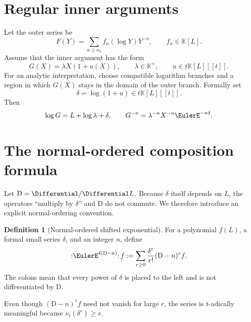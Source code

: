 \documentclass[11pt,openany]{book}
\theoremstyle{definition}
\newtheorem{definition}{Definition}[chapter]
\theoremstyle{plain}
\theoremstyle{remark}
\newcommand{\K}{\mathbb{K}}
\newcommand{\val}{\nu}
\newcommand{\Dop}{\mathrm{D}}
\begin{document}
\section{Regular inner arguments}
Let the outer series be
\begin{equation}\label{eq:outer-composition}
 F(Y)=\sum_{n\ge n_0}f_n(\log Y)Y^{-n},
 \qquad f_n\in\K[L].
\end{equation}
Assume that the inner argument has the form
\begin{equation}\label{eq:regular-inner}
 G(X)=\lambda X(1+u(X)),
 \qquad \lambda\in\K^\times,
 \qquad u\in t\K[L][[t]].
\end{equation}
For an analytic interpretation, choose compatible logarithm branches and a
region in which \(G(X)\) stays in the domain of the outer branch.  Formally set
\begin{equation}\label{eq:delta-def}
 \delta=\log(1+u)\in t\K[L][[t]].
\end{equation}
Then
\begin{equation}\label{eq:logG-and-power}
 \log G=L+\log\lambda+\delta,
 \qquad
 G^{-n}=\lambda^{-n}X^{-n}\EulerE^{-n\delta}.
\end{equation}

\section{The normal-ordered composition formula}
Let \(\Dop=\Differential/\Differential L\).  Because \(\delta\) itself depends on \(L\), the
operators ``multiply by \(\delta\)'' and \(\Dop\) do not commute.  We therefore
introduce an explicit normal-ordering convention.

\begin{definition}[Normal-ordered shifted exponential]\label{def:normal-ordered}
For a polynomial \(f(L)\), a formal small series \(\delta\), and an integer
\(n\), define
\begin{equation}\label{eq:normal-ordered-def}
 \mathopen{:}\EulerE^{\delta(\Dop-n)}\mathclose{:}\,f
 :=\sum_{r\ge0}\frac{\delta^r}{r!}(\Dop-n)^rf.
\end{equation}
The colons mean that every power of \(\delta\) is placed to the left and is not
differentiated by \(\Dop\).
\end{definition}
Even though \((\Dop-n)^rf\) need not vanish for large \(r\), the series is
t-adically meaningful because \(\val_t(\delta^r)\ge r\).
\end{document}
